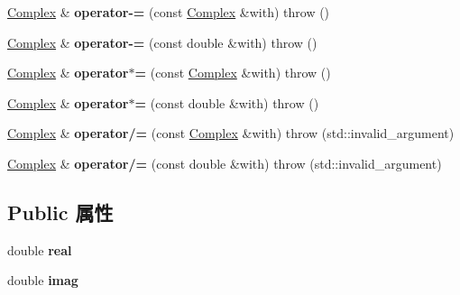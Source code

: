 \begin{DoxyCompactItemize}
\item 
\mbox{\label{classkerbal_1_1math_1_1_complex_a8e86d7214379e025db09b2c352abccf4}} 
\hyperlink{classkerbal_1_1math_1_1_complex}{Complex} \& {\bfseries operator-\/=} (const \hyperlink{classkerbal_1_1math_1_1_complex}{Complex} \&with)  throw ()
\item 
\mbox{\label{classkerbal_1_1math_1_1_complex_abad788b976ac951707e7acfb57867fe8}} 
\hyperlink{classkerbal_1_1math_1_1_complex}{Complex} \& {\bfseries operator-\/=} (const double \&with)  throw ()
\item 
\mbox{\label{classkerbal_1_1math_1_1_complex_a80fa12532ac44161e8ce029b1139d2ff}} 
\hyperlink{classkerbal_1_1math_1_1_complex}{Complex} \& {\bfseries operator$\ast$=} (const \hyperlink{classkerbal_1_1math_1_1_complex}{Complex} \&with)  throw ()
\item 
\mbox{\label{classkerbal_1_1math_1_1_complex_acd9f64fb8975e4e5a2e546672c19f43d}} 
\hyperlink{classkerbal_1_1math_1_1_complex}{Complex} \& {\bfseries operator$\ast$=} (const double \&with)  throw ()
\item 
\mbox{\label{classkerbal_1_1math_1_1_complex_aa1d3de24e59f35f4ffb6925868225abb}} 
\hyperlink{classkerbal_1_1math_1_1_complex}{Complex} \& {\bfseries operator/=} (const \hyperlink{classkerbal_1_1math_1_1_complex}{Complex} \&with)  throw (std\+::invalid\+\_\+argument)
\item 
\mbox{\label{classkerbal_1_1math_1_1_complex_a66ae29dc78a4771fce9076fa485f678a}} 
\hyperlink{classkerbal_1_1math_1_1_complex}{Complex} \& {\bfseries operator/=} (const double \&with)  throw (std\+::invalid\+\_\+argument)
\end{DoxyCompactItemize}
\subsection*{Public 属性}
\begin{DoxyCompactItemize}
\item 
\mbox{\label{classkerbal_1_1math_1_1_complex_ac7d0aad7bc9e446952543e2eafbec4ec}} 
double {\bfseries real}
\item 
\mbox{\label{classkerbal_1_1math_1_1_complex_a92c0cc31ef7b0306f111a234b6da8659}} 
double {\bfseries imag}
\end{DoxyCompactItemize}

